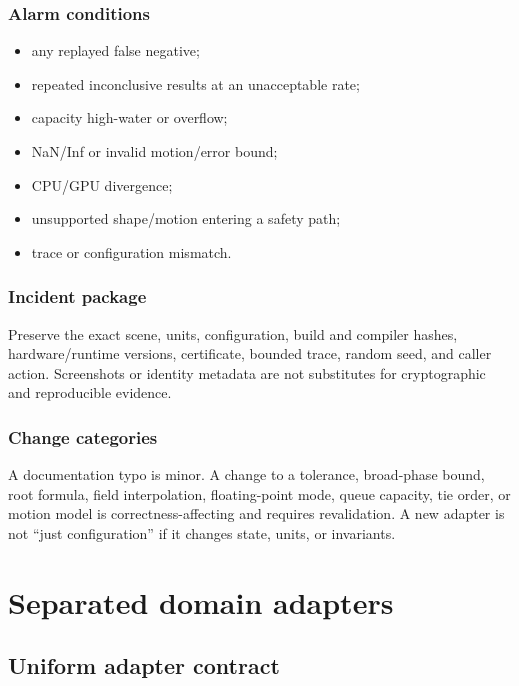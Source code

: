 \documentclass[11pt,a4paper,openany]{book}
\begin{document}
\section{Alarm conditions}
\begin{itemize}
  \item any replayed false negative;
  \item repeated inconclusive results at an unacceptable rate;
  \item capacity high-water or overflow;
  \item NaN/Inf or invalid motion/error bound;
  \item CPU/GPU divergence;
  \item unsupported shape/motion entering a safety path;
  \item trace or configuration mismatch.
\end{itemize}

\section{Incident package}
Preserve the exact scene, units, configuration, build and compiler hashes, hardware/runtime versions, certificate, bounded trace, random seed, and caller action. Screenshots or identity metadata are not substitutes for cryptographic and reproducible evidence.

\section{Change categories}
A documentation typo is minor. A change to a tolerance, broad-phase bound, root formula, field interpolation, floating-point mode, queue capacity, tie order, or motion model is correctness-affecting and requires revalidation. A new adapter is not ``just configuration'' if it changes state, units, or invariants.



\part{Separated domain adapters}

\chapter{Uniform adapter contract}
\end{document}
